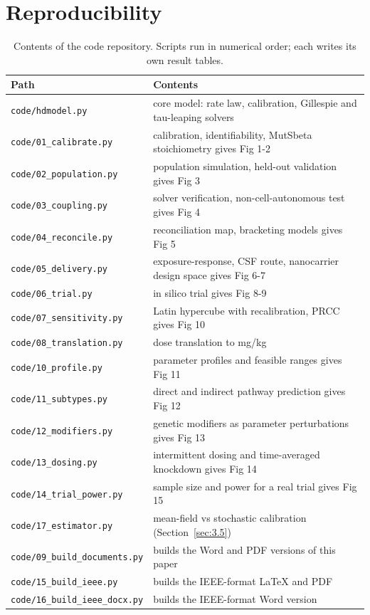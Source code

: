 \documentclass[conference]{IEEEtran}
\begin{document}
\section{Reproducibility}
\label{sec:6}
\begin{table}[!t]
\caption{Contents of the code repository. Scripts run in numerical order; each writes its own result tables.}
\label{tab:code}
\centering
\footnotesize
\begin{tabular}{@{}ll@{}}
\toprule
\textbf{Path} & \textbf{Contents} \\
\midrule
\texttt{code/hdmodel.py} & core model: rate law, calibration, Gillespie and tau-leaping solvers \\
\texttt{code/01\_calibrate.py} & calibration, identifiability, MutSbeta stoichiometry   gives Fig 1-2 \\
\texttt{code/02\_population.py} & population simulation, held-out validation             gives Fig 3 \\
\texttt{code/03\_coupling.py} & solver verification, non-cell-autonomous test          gives Fig 4 \\
\texttt{code/04\_reconcile.py} & reconciliation map, bracketing models                  gives Fig 5 \\
\texttt{code/05\_delivery.py} & exposure-response, CSF route, nanocarrier design space gives Fig 6-7 \\
\texttt{code/06\_trial.py} & in silico trial                                        gives Fig 8-9 \\
\texttt{code/07\_sensitivity.py} & Latin hypercube with recalibration, PRCC               gives Fig 10 \\
\texttt{code/08\_translation.py} & dose translation to mg/kg \\
\texttt{code/10\_profile.py} & parameter profiles and feasible ranges                 gives Fig 11 \\
\texttt{code/11\_subtypes.py} & direct and indirect pathway prediction                 gives Fig 12 \\
\texttt{code/12\_modifiers.py} & genetic modifiers as parameter perturbations           gives Fig 13 \\
\texttt{code/13\_dosing.py} & intermittent dosing and time-averaged knockdown        gives Fig 14 \\
\texttt{code/14\_trial\_power.py} & sample size and power for a real trial                 gives Fig 15 \\
\texttt{code/17\_estimator.py} & mean-field vs stochastic calibration (Section~\ref{sec:3.5}) \\
\texttt{code/09\_build\_documents.py} & builds the Word and PDF versions of this paper \\
\texttt{code/15\_build\_ieee.py} & builds the IEEE-format LaTeX and PDF \\
\texttt{code/16\_build\_ieee\_docx.py} & builds the IEEE-format Word version \\
\bottomrule
\end{tabular}
\end{table}
\end{document}
